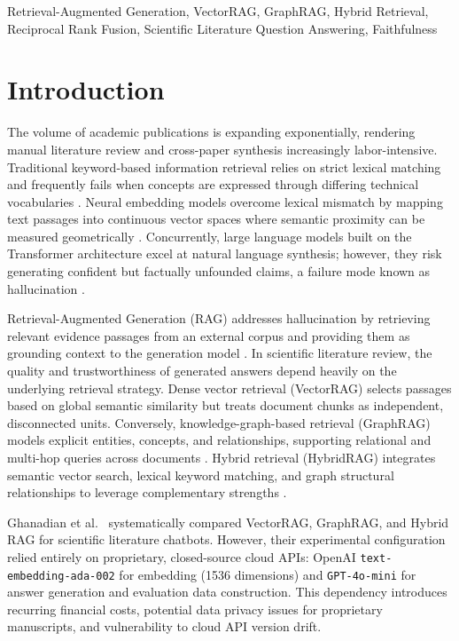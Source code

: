 \documentclass[conference]{IEEEtran}
\begin{document}
\begin{IEEEkeywords}
Retrieval-Augmented Generation, VectorRAG, GraphRAG, Hybrid Retrieval, Reciprocal Rank Fusion, Scientific Literature Question Answering, Faithfulness
\end{IEEEkeywords}


\section{Introduction}
The volume of academic publications is expanding exponentially, rendering manual literature review and cross-paper synthesis increasingly labor-intensive. Traditional keyword-based information retrieval relies on strict lexical matching and frequently fails when concepts are expressed through differing technical vocabularies \cite{robertson2009bm25}. Neural embedding models overcome lexical mismatch by mapping text passages into continuous vector spaces where semantic proximity can be measured geometrically \cite{reimers2019sbert,karpukhin2020dpr}. Concurrently, large language models built on the Transformer architecture \cite{vaswani2017attention} excel at natural language synthesis; however, they risk generating confident but factually unfounded claims, a failure mode known as hallucination \cite{ji2023hallucination}.

Retrieval-Augmented Generation (RAG) addresses hallucination by retrieving relevant evidence passages from an external corpus and providing them as grounding context to the generation model \cite{lewis2020rag,gao2023ragsurvey}. In scientific literature review, the quality and trustworthiness of generated answers depend heavily on the underlying retrieval strategy. Dense vector retrieval (VectorRAG) selects passages based on global semantic similarity but treats document chunks as independent, disconnected units. Conversely, knowledge-graph-based retrieval (GraphRAG) models explicit entities, concepts, and relationships, supporting relational and multi-hop queries across documents \cite{edge2024graphrag,peng2024graphragsurvey}. Hybrid retrieval (HybridRAG) integrates semantic vector search, lexical keyword matching, and graph structural relationships to leverage complementary strengths \cite{sarmah2024hybridrag}.

Ghanadian et al.\ \cite{ghanadian2026base} systematically compared VectorRAG, GraphRAG, and Hybrid RAG for scientific literature chatbots. However, their experimental configuration relied entirely on proprietary, closed-source cloud APIs: OpenAI \texttt{text-embedding-ada-002} for embedding (1536 dimensions) and \texttt{GPT-4o-mini} for answer generation and evaluation data construction. This dependency introduces recurring financial costs, potential data privacy issues for proprietary manuscripts, and vulnerability to cloud API version drift.
\end{document}
